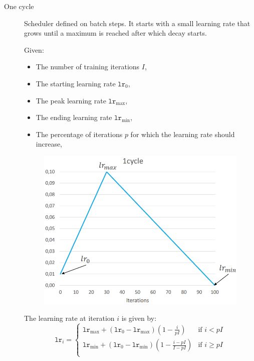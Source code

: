 \begin{description}
    \item[One cycle]
        Scheduler defined on batch steps. It starts with a small learning rate that grows until a maximum is reached after which decay starts.

        \begin{minipage}{0.6\linewidth}
            Given:
            \begin{itemize}
                \item The number of training iterations $I$,
                \item The starting learning rate $\texttt{lr}_0$,
                \item The peak learning rate $\texttt{lr}_{\max}$,
                \item The ending learning rate $\texttt{lr}_{\min}$,
                \item The percentage of iterations $p$ for which the learning rate should increase,
            \end{itemize}
        \end{minipage}
        \begin{minipage}{0.35\linewidth}
            \begin{figure}[H]
                \centering
                \includegraphics[width=0.9\linewidth]{./img/lr_schedule_1cycle.png}
            \end{figure}
        \end{minipage}

        The learning rate at iteration $i$ is given by:
        \[ 
            \texttt{lr}_i = 
                \begin{cases}
                    \texttt{lr}_{\max} + (\texttt{lr}_0 - \texttt{lr}_{\max}) \left( 1 - \frac{i}{pI} \right) & \text{if $i < pI$} \\
                    \texttt{lr}_{\min} + (\texttt{lr}_0 - \texttt{lr}_{\min}) \left( 1 - \frac{i - pI}{I - pI} \right) & \text{if $i \geq pI$} \\
                \end{cases}
        \]
\end{description}




